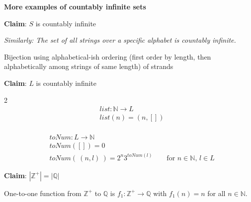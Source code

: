 \documentclass[12pt, oneside]{article}
\begin{document}
 

{\bf More examples of countably infinite sets}

{\bf Claim}: $S$ is countably infinite

{\it Similarly: The set of all strings over a specific alphabet is countably infinite.}
\begin{center}
Bijection using alphabetical-ish ordering
(first order by length, then alphabetically among strings of same length) 
of strands
\end{center}

\vspace{50pt}


{\bf Claim}: $L$ is countably infinite

\begin{multicols}{2}
\begin{align*}
    &list: \mathbb{N} \to L \\
    &list(n) = (n, []) \\
    &
\end{align*}

\begin{align*}
    &toNum: L \to \mathbb{N} \\
    &toNum([]) = 0 \\
    &toNum( ~(n,l)~) = 2^n 3^{toNum(l)} \qquad \text{for $n \in \mathbb{N}$, $l \in L$}
\end{align*}
\end{multicols}
\vspace{30pt}

{\bf Claim}: $|\mathbb{Z}^+| = |\mathbb{Q}|$ 

One-to-one function from $\mathbb{Z}^+$ to $\mathbb{Q}$
is $f_1: \mathbb{Z}^+ \to \mathbb{Q}$ with $f_1(n) = n$ for all 
$n \in \mathbb{N}$.

\vspace{30pt}
\end{document}
